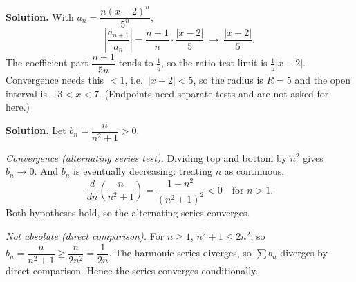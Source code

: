 \documentclass[12pt]{article}
\begin{document}


\textbf{Solution.} With $a_{n}=\dfrac{n(x-2)^{n}}{5^{n}}$,
\[
\left|\frac{a_{n+1}}{a_{n}}\right|
=\frac{n+1}{n}\cdot\frac{|x-2|}{5}\ \longrightarrow\ \frac{|x-2|}{5}.
\]
The coefficient part $\dfrac{n+1}{5n}$ tends to $\tfrac{1}{5}$, so the ratio-test limit is $\tfrac{1}{5}|x-2|$. Convergence needs this $<1$, i.e.\ $|x-2|<5$, so the radius is $R=5$ and the open interval is $-3<x<7$. (Endpoints need separate tests and are not asked for here.)



\textbf{Solution.} Let $b_{n}=\dfrac{n}{n^{2}+1}>0$.
\par
\emph{Convergence (alternating series test).} Dividing top and bottom by $n^{2}$ gives $b_{n}\to 0$. And $b_{n}$ is eventually decreasing: treating $n$ as continuous,
\[
\frac{d}{dn}\!\left(\frac{n}{n^{2}+1}\right)=\frac{1-n^{2}}{(n^{2}+1)^{2}}<0\quad\text{for } n>1 .
\]
Both hypotheses hold, so the alternating series converges.
\par
\emph{Not absolute (direct comparison).} For $n\ge 1$, $n^{2}+1\le 2n^{2}$, so $b_{n}=\dfrac{n}{n^{2}+1}\ge\dfrac{n}{2n^{2}}=\dfrac{1}{2n}$. The harmonic series diverges, so $\sum b_{n}$ diverges by direct comparison. Hence the series converges conditionally.

\end{document}
